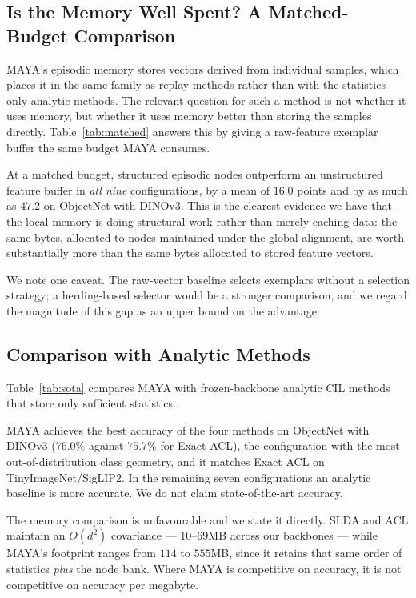 \subsection{Is the Memory Well Spent? A Matched-Budget Comparison}
\label{sec:matched}

MAYA's episodic memory stores vectors derived from individual samples, which places it in the same family as replay methods rather than with the statistics-only analytic methods. The relevant question for such a method is not whether it uses memory, but whether it uses memory better than storing the samples directly. Table~\ref{tab:matched} answers this by giving a raw-feature exemplar buffer the same budget MAYA consumes.



At a matched budget, structured episodic nodes outperform an unstructured feature buffer in \emph{all nine} configurations, by a mean of $16.0$ points and by as much as $47.2$ on ObjectNet with DINOv3. This is the clearest evidence we have that the local memory is doing structural work rather than merely caching data: the same bytes, allocated to nodes maintained under the global alignment, are worth substantially more than the same bytes allocated to stored feature vectors.

We note one caveat. The raw-vector baseline selects exemplars without a selection strategy; a herding-based selector would be a stronger comparison, and we regard the magnitude of this gap as an upper bound on the advantage.

\subsection{Comparison with Analytic Methods}
\label{sec:sota}

Table~\ref{tab:sota} compares MAYA with frozen-backbone analytic CIL methods that store only sufficient statistics.



MAYA achieves the best accuracy of the four methods on ObjectNet with DINOv3 ($76.0\%$ against $75.7\%$ for Exact ACL), the configuration with the most out-of-distribution class geometry, and it matches Exact ACL on TinyImageNet/SigLIP2. In the remaining seven configurations an analytic baseline is more accurate. We do not claim state-of-the-art accuracy.

The memory comparison is unfavourable and we state it directly. SLDA and ACL maintain an $O(d^2)$ covariance --- $10$--$69$MB across our backbones --- while MAYA's footprint ranges from $114$ to $555$MB, since it retains that same order of statistics \emph{plus} the node bank. Where MAYA is competitive on accuracy, it is not competitive on accuracy per megabyte.

